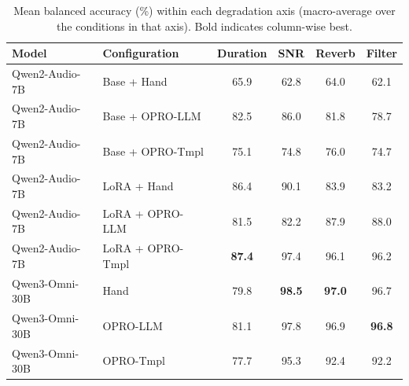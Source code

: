 \begin{table}[t]
\centering
\caption{Mean balanced accuracy (\%) within each degradation axis (macro-average over the conditions in that axis). Bold indicates column-wise best.}
\label{tab:r04_dimension_means}
\footnotesize
\setlength{\tabcolsep}{4pt}
\renewcommand{\arraystretch}{1.12}
\begin{tabular}{llcccc}
\toprule
\textbf{Model} & \textbf{Configuration} & \textbf{Duration} & \textbf{SNR} & \textbf{Reverb} & \textbf{Filter} \\
\midrule
Qwen2-Audio-7B & Base + Hand & 65.9 & 62.8 & 64.0 & 62.1 \\
Qwen2-Audio-7B & Base + OPRO-LLM & 82.5 & 86.0 & 81.8 & 78.7 \\
Qwen2-Audio-7B & Base + OPRO-Tmpl & 75.1 & 74.8 & 76.0 & 74.7 \\
\midrule
Qwen2-Audio-7B & LoRA + Hand & 86.4 & 90.1 & 83.9 & 83.2 \\
Qwen2-Audio-7B & LoRA + OPRO-LLM & 81.5 & 82.2 & 87.9 & 88.0 \\
Qwen2-Audio-7B & LoRA + OPRO-Tmpl & \textbf{87.4} & 97.4 & 96.1 & 96.2 \\
\midrule
Qwen3-Omni-30B & Hand & 79.8 & \textbf{98.5} & \textbf{97.0} & 96.7 \\
Qwen3-Omni-30B & OPRO-LLM & 81.1 & 97.8 & 96.9 & \textbf{96.8} \\
Qwen3-Omni-30B & OPRO-Tmpl & 77.7 & 95.3 & 92.4 & 92.2 \\
\bottomrule
\end{tabular}
\end{table}